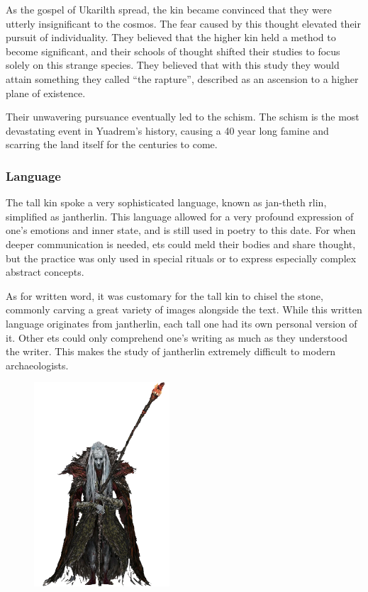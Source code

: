 As the gospel of Ukarilth spread, the kin became convinced that they were utterly insignificant to the cosmos.
The fear caused by this thought elevated their pursuit of individuality.
They believed that the higher kin held a method to become significant, and their schools of thought shifted their studies to focus solely on this strange species.
They believed that with this study they would attain something they called ``the rapture'', described as an ascension to a higher plane of existence.

Their unwavering pursuance eventually led to the schism.
The schism is the most devastating event in Yuadrem's history, causing a 40 year long famine and scarring the land itself for the centuries to come.

\subsubsection{Language}
The tall kin spoke a very sophisticated language, known as jan-theth rlin, simplified as jantherlin.
This language allowed for a very profound expression of one's emotions and inner state, and is still used in poetry to this date.
For when deeper communication is needed, ets could meld their bodies and share thought, but the practice was only used in special rituals or to express especially complex abstract concepts.

As for written word, it was customary for the tall kin to chisel the stone, commonly carving a great variety of images alongside the text.
While this written language originates from jantherlin, each tall one had its own personal version of it.
Other ets could only comprehend one's writing as much as they understood the writer.
This makes the study of jantherlin extremely difficult to modern archaeologists.

\begin{figure}[t]
    \centering
    \includegraphics[width=0.45\textwidth]{04kins/img/10et_cleric.png}
\end{figure}

